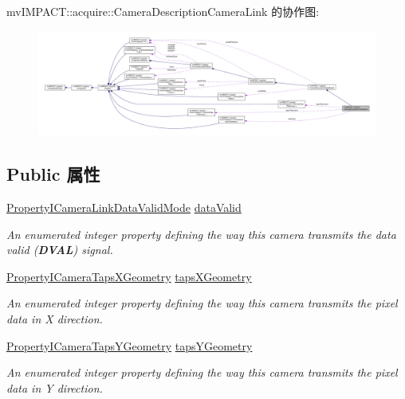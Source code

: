 mv\+I\+M\+P\+A\+C\+T\+:\+:acquire\+:\+:Camera\+Description\+Camera\+Link 的协作图\+:
\nopagebreak
\begin{figure}[H]
\begin{center}
\leavevmode
\includegraphics[width=350pt]{classmv_i_m_p_a_c_t_1_1acquire_1_1_camera_description_camera_link__coll__graph}
\end{center}
\end{figure}
\subsection*{Public 属性}
\begin{DoxyCompactItemize}
\item 
\hyperlink{group___device_specific_interface_gaf6940dc7fdb7d3db42b5cace6bca208b}{Property\+I\+Camera\+Link\+Data\+Valid\+Mode} \hyperlink{classmv_i_m_p_a_c_t_1_1acquire_1_1_camera_description_camera_link_acf103eb0dc8dfb45567c4be3e1fe001e}{data\+Valid}
\begin{DoxyCompactList}\small\item\em An enumerated integer property defining the way this camera transmits the data valid ({\bfseries D\+V\+A\+L}) signal. \end{DoxyCompactList}\item 
\hyperlink{group___device_specific_interface_gadb3acd27da51bc318c073aa7d052607b}{Property\+I\+Camera\+Taps\+X\+Geometry} \hyperlink{classmv_i_m_p_a_c_t_1_1acquire_1_1_camera_description_camera_link_ae00a43dc132c45342054a60f1535c086}{taps\+X\+Geometry}
\begin{DoxyCompactList}\small\item\em An enumerated integer property defining the way this camera transmits the pixel data in X direction. \end{DoxyCompactList}\item 
\hyperlink{group___device_specific_interface_ga8ca68a8fc0e8c81dacb76b2cfc289909}{Property\+I\+Camera\+Taps\+Y\+Geometry} \hyperlink{classmv_i_m_p_a_c_t_1_1acquire_1_1_camera_description_camera_link_a284e7283b6a82c2fa44a22f90a85ce7e}{taps\+Y\+Geometry}
\begin{DoxyCompactList}\small\item\em An enumerated integer property defining the way this camera transmits the pixel data in Y direction. \end{DoxyCompactList}\end{DoxyCompactItemize}
